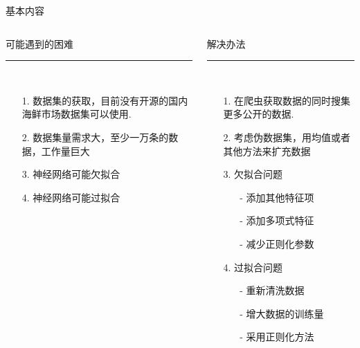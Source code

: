 \documentclass{ctexbeamer}
\begin{document}
    \begin{frame}[plain]{基本内容}
        \begin{columns}
            \begin{column}{.5\textwidth}
                \begin{center}
                    \large 可能遇到的困难
                    \rule[5pt]{4cm}{0.005em}\\
                    \normalsize 
                    \begin{itemize}
                        \item[1.] 数据集的获取，目前没有开源的国内海鲜市场数据集可以使用.
                        \item[2.] 数据集量需求大，至少一万条的数据，工作量巨大
                        \item[3.] 神经网络可能欠拟合
                        \item[4.] 神经网络可能过拟合
                    \end{itemize}
                \end{center}
            \end{column}
            \begin{column}{.5\textwidth}
                \begin{center}
                    \large 解决办法
                    \rule[5pt]{4cm}{0.005em}\\
                    \normalsize
                    \begin{itemize}
                        \item[1.] 在爬虫获取数据的同时搜集更多公开的数据.
                        \item[2.] 考虑伪数据集，用均值或者其他方法来扩充数据
                        \item[3.] 欠拟合问题
                            \begin{itemize}
                                \item[-] 添加其他特征项 
                                \item[-] 添加多项式特征
                                \item[-] 减少正则化参数
                            \end{itemize} 
                        \item[4.] 过拟合问题
                        \begin{itemize}
                            \item[-] 重新清洗数据  
                            \item[-] 增大数据的训练量
                            \item[-] 采用正则化方法
                        \end{itemize} 
                    \end{itemize}
                \end{center}
            \end{column}
        \end{columns}
    \end{frame}
\end{document}
